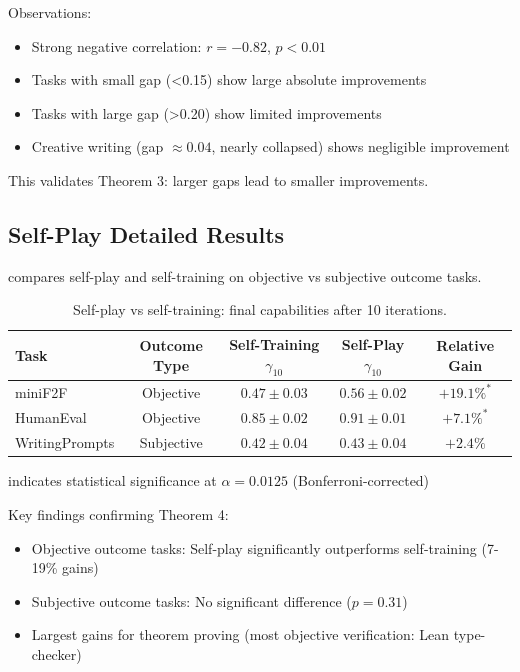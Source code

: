 \documentclass{article}
\theoremstyle{definition}
\theoremstyle{remark}
\begin{document}
Observations:
\begin{itemize}
\item Strong negative correlation: \(r = -0.82\), \(p < 0.01\)
\item Tasks with small gap (\textless 0.15) show large absolute improvements
\item Tasks with large gap (\textgreater 0.20) show limited improvements
\item Creative writing (gap \(\approx 0.04\), nearly collapsed) shows negligible improvement
\end{itemize}

This validates Theorem 3: larger gaps lead to smaller improvements.

\subsection{Self-Play Detailed Results}

 compares self-play and self-training on objective vs subjective outcome tasks.

\begin{table}[h]
\centering
\caption{Self-play vs self-training: final capabilities after 10 iterations.}
\label{tab:selfplay-detailed}
\begin{tabular}{lcccc}
\toprule
Task & Outcome Type & Self-Training \(\gamma_{10}\) & Self-Play \(\gamma_{10}\) & Relative Gain \\
\midrule
miniF2F & Objective & \(0.47 \pm 0.03\) & \(0.56 \pm 0.02\) & \(+19.1\%^*\) \\
HumanEval & Objective & \(0.85 \pm 0.02\) & \(0.91 \pm 0.01\) & \(+7.1\%^*\) \\
WritingPrompts & Subjective & \(0.42 \pm 0.04\) & \(0.43 \pm 0.04\) & \(+2.4\%\) \\
\bottomrule
\end{tabular}
\end{table}

\noindent * indicates statistical significance at \(\alpha = 0.0125\) (Bonferroni-corrected)

Key findings confirming Theorem 4:
\begin{itemize}
\item Objective outcome tasks: Self-play significantly outperforms self-training (7-19\% gains)
\item Subjective outcome tasks: No significant difference (\(p = 0.31\))
\item Largest gains for theorem proving (most objective verification: Lean type-checker)
\end{itemize}
\end{document}
